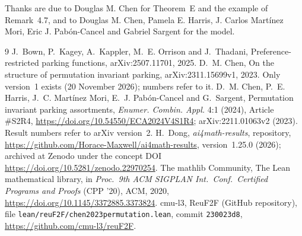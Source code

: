 \documentclass[11pt]{article}
\theoremstyle{remark}
\newcommand{\repoversion}{1.25.0}
\begin{document}
\medskip
\noindent Thanks are due to Douglas M. Chen for Theorem~E and the example of
Remark~4.7, and to Douglas M. Chen, Pamela E. Harris, J. Carlos Martínez Mori,
Eric J. Pabón-Cancel and Gabriel Sargent for the model.

{\small
\begin{thebibliography}{9}\setlength{\itemsep}{0pt}
 J.~Bown, P.~Kagey, A.~Kappler, M.~E. Orrison and J.~Thadani,
Preference-restricted parking functions, arXiv:2507.11701, 2025.
 D.~M. Chen, On the structure of permutation invariant parking,
arXiv:2311.15699v1, 2023. Only version~1 exists (20 November 2026); numbers
refer to it.
 D.~M. Chen, P.~E. Harris, J.~C. Martínez Mori, E.~J.
Pabón-Cancel and G.~Sargent, Permutation invariant parking assortments,
\emph{Enumer. Combin. Appl.} 4:1 (2024), Article \#S2R4,
\url{https://doi.org/10.54550/ECA2024V4S1R4}; arXiv:2211.01063v2 (2023).
Result numbers refer to arXiv version~2.
 H.~Dong, \emph{ai4math-results}, repository,
\url{https://github.com/Horace-Maxwell/ai4math-results}, version~\repoversion{}
(2026); archived at Zenodo under the concept DOI
\url{https://doi.org/10.5281/zenodo.22970254}.
The mathlib Community, The Lean mathematical library, in \emph{Proc.\ 9th ACM
SIGPLAN Int.\ Conf.\ Certified Programs and Proofs} (CPP '20), ACM, 2020,
\url{https://doi.org/10.1145/3372885.3373824}.
 cmu-l3, ReuF2F (GitHub repository), file
\texttt{lean/reuF2F/chen2023permutation.lean}, commit \texttt{230023d8},
\url{https://github.com/cmu-l3/reuF2F}.
\end{thebibliography}}
\end{document}
